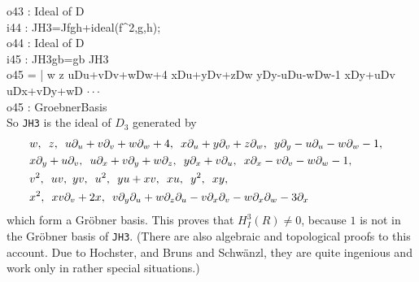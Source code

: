 \begin{example}
o43 : Ideal of D\\
\endOutput
\beginOutput
i44 : JH3=Jfgh+ideal(f^2,g,h);\\
\emptyLine
o44 : Ideal of D\\
\endOutput
\beginOutput
i45 : JH3gb=gb JH3\\
\emptyLine
o45 = | w z uDu+vDv+wDw+4 xDu+yDv+zDw yDy-uDu-wDw-1 xDy+uDv uDx+vDy+wD $\cdot\cdot\cdot$\\
\emptyLine
o45 : GroebnerBasis\\
\endOutput
So {\tt JH3} is the ideal of $D_3$ generated by
\begin{eqnarray*}
&w,\,\,\, z,\,\,\, u\partial_u+v\partial_v+w\partial_w+4,\,\,\,
x\partial_u+y\partial_v+z\partial_w,\,\, \, 
y\partial_y-u\partial_u-w\partial_w-1,&\\ 
&x\partial_y+u\partial_v,\,\,\, 
            u\partial_x+v\partial_y+w\partial_z,\,\,\, y\partial_x+v\partial_u,\,\,\,
x\partial_x-v\partial_v-w\partial_w-1,&\\ & v^2,\,\,\, uv,\,\, yv,\,\,\,
u^2,\,\,\, yu+xv,\,\, \, 
            xu,\,\,\, y^2,\,\, \,xy,&\\ &x^2,\,\,\, xv\partial_v+2x,\,\,\,
v\partial_y\partial_u+w\partial_z\partial_u-v\partial_x\partial_v-w\partial_x\partial_w-3\partial_x&
\end{eqnarray*}
which form a Gr\"obner basis.
This proves that $H^3_I(R)\not =0$, because $1$ is not in the 
Gr\"obner basis of {\tt JH3}.
(There are also algebraic and topological proofs to this account. 
Due to Hochster, and Bruns and
Schw\"anzl, they are quite 
ingenious and work only in rather special situations.)



\end{example}
